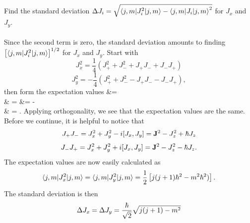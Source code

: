 \documentclass[11pt,letterpaper]{article}
\begin{document}
		\item 
		Find the standard deviation $\Delta J_i = \sqrt{\braket{j,m|J_i^2|j,m}-\braket{j,m|J_i|j,m}^2}$ for $J_x$ and $J_y$. 
		\\
		\\
		Since the second term is zero, the standard deviation amounts to finding $\left[\braket{j,m|J_i^2|j,m}\right]^{1/2}$ for $J_x$
		and $J_y$. Start with
		\[
			J_x^2 = \frac{1}{4}(J_+^2+J_-^2+J_+J_-+J_-J_+)
		\]
		\[
			J_y^2 = -\frac{1}{4}(J_+^2+J_-^2-J_+J_--J_-J_+),	
		\]
		then form the expectation values
		\ba
			 &= \\
			&  =  
		\ea
		\ba
			 &= -\\
			&  =  .
		\ea
		Applying orthogonality, we see that the expectation values are the same. Before we continue, it is helpful to notice that
		\[
			J_+J_- = J_x^2+J_y^2-i[J_x,J_y] = \mathbf{J}^2-J_z^2+\hbar J_z
		\]
		\[
			J_-J_+ = J_x^2+J_y^2+i[J_x,J_y] = \mathbf{J}^2-J_z^2-\hbar J_z.
		\]
		The expectation values are now easily calculated as 
		\[
			\braket{j,m|J_x^2|j,m} = \braket{j,m|J_y^2|j,m}=\frac{1}{2}\left[j(j+1)\hbar^2-m^2\hbar^2)\right].
		\]
		The standard deviation is then
		\[
			\Delta J_x = \Delta J_y = \frac{\hbar}{\sqrt 2}\sqrt{j(j+1)-m^2}
		\]
		\\
		
\end{document}

